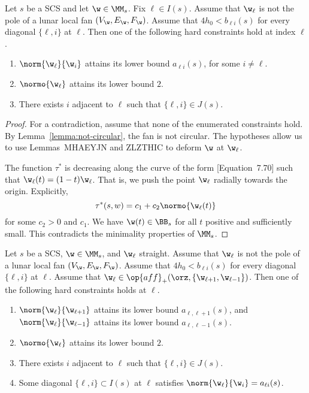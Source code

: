 \begin{lemma}\label{lemma:odx2} 
Let $s$ be a SCS and let $\w\in \MM_s$.  Fix $\ell\in I(s)$.
Assume  that $\w_\ell$ is not the pole of a lunar local fan $(V_\w,E_\w,F_\w)$.
Assume that $4h_0 < b_{\ell i}(s)$ for every diagonal $\{\ell,i\}$ at $\ell$.
Then one of the following hard  constraints hold at index $\ell$.
\begin{enumerate}
\item $\norm{\w_\ell}{\w_i}$ attains its lower bound $a_{\ell i}(s)$, for
  some $i\ne \ell$.
\item $\normo{\w_\ell}$ attains its lower bound $2$.
\item There exists $i$ adjacent to $\ell$ such that $\{\ell,i\}\in J(s)$.
\end{enumerate}
\end{lemma}

\begin{proof} 
For a contradiction, assume that none of the enumerated constraints hold.
By Lemma~\ref{lemma:not-circular}, the fan is not circular.
The hypotheses
allow us to use Lemmas~MHAEYJN and
ZLZTHIC to deform $\w$ at $\w_\ell$.

The function $\tau^*$ is decreasing along
the curve of the form \cite{DSP}[Equation~7.70] %
such that
$\w_\ell(t)=(1-t) \w_\ell$.
That is, we push the point $\w_\ell$ radially towards the origin.
Explicitly, 
\[
\tau^*(s,w) = c_1 + c_2 \normo{\w_\ell(t)}
\]
for some $c_2>0$ and $c_1$.
We have
$\w(t)\in \BB_s$ for all $t$ positive and sufficiently
small.  This contradicts the minimality properties of $\MM_s$.
\end{proof}

\begin{lemma}\label{lemma:imj2}
Let $s$ be a SCS, $\w\in \MM_s$, and $\w_\ell$ straight.
Assume  that $\w_\ell$ is not the pole of a lunar local fan $(V_\w,E_\w,F_\w)$.
Assume that $4h_0 < b_{\ell i}(s)$ for every diagonal $\{\ell,i\}$ at $\ell$.
Assume that $\w_\ell\in \op{aff}_+(\orz,\{\w_{\ell+1},\w_{\ell-1}\})$.
Then one of the following hard constraints holds at $\ell$.
\begin{enumerate}
\item $\norm{\w_\ell}{\w_{\ell+1}}$ attains its lower bound $a_{\ell,\ell+1}(s)$, and
 $\norm{\w_\ell}{\w_{\ell-1}}$ attains its lower bound $a_{\ell,\ell-1}(s)$.
\item $\normo{\w_\ell}$ attains its lower bound $2$.
\item There exists $i$ adjacent to $\ell$ such that $\{\ell,i\}\in J(s)$.
\item Some diagonal $\{\ell,i\}\subset I(s)$ at $\ell$ satisfies
$\norm{\w_\ell}{\w_i}=a_{\ell i}(s)$.
\end{enumerate}
\end{lemma}

